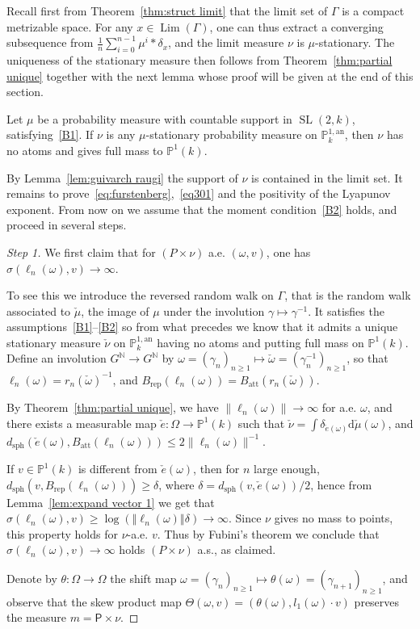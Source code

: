 \documentclass[AHL,Unicode,longabstracts]{cedram}
\DeclareMathOperator{\Lm}{Lim}
\DeclareMathOperator{\sph}{sph}
\DeclareMathOperator{\SL}{SL}
\newcommand{\nn}{\mathbb{N}}
\newcommand{\pp}{\mathbb{P}}
\newcommand{\prob}{\mathsf{P}}
\newcommand{\cv}{\rightarrow}
\newcommand{\norm}[1]{\left\Vert#1\right\Vert}
\newcommand{\PP}{\mathbb{P}}
\newcommand{\berk}{{\mathbb{P}^{1, \mathrm{an}}_k}}
\newcommand{\att}{\mathrm{att}}
\newcommand{\rep}{\mathrm{rep}}
\newcommand{\SLk}{\SL(2,k)}
\newcommand*{\dd}{\mathrm{d}}
\newenvironment{step}{\begin{proof}}{\let\qed\relax \end{proof}}
\begin{document}
Recall first from Theorem~\ref{thm:struct limit} that the limit set of $\Gamma$ is a compact metrizable space. For any $x\in \Lm(\Gamma)$, one can thus extract a converging subsequence from $\frac1{n} \sum_{i=0}^{n-1}\mu^ i \ast \delta_{x}$, and the limit measure $\nu$ is $\mu$-stationary. The uniqueness of the stationary measure then follows from Theorem~\ref{thm:partial unique} together with the next lemma whose proof will be given at the end of this section.

\begin{lemm}\label{lem:Hk}
Let $\mu$ be a probability measure with countable support in $\SLk$, satisfying~\eqref{B1}. If $\nu$ is any $\mu$-stationary probability measure on $\berk$, then $\nu$ has no atoms and gives full mass to $ \PP^1(k)$.
\end{lemm}

By Lemma~\ref{lem:guivarch raugi} the support of $\nu$ is contained in the limit set. It remains to prove~\eqref{eq:furstenberg},~\eqref{eq301} and the positivity of the Lyapunov exponent. From now on we assume that the moment condition~\eqref{B2} holds, and proceed in several steps.

\begin{step}[Step 1]
We first claim that for $(P\times \nu)$ a.e. $(\omega,v)$, one has $\sigma(\ell_n(\omega), v)\cv\infty$.

To see this we introduce the reversed random walk on $\Gamma$, that is the random walk associated to $\check \mu$, the image of $\mu$ under the involution $\gamma\mapsto \gamma^{-1}$. It satisfies the assumptions~\eqref{B1}--\eqref{B2} so from what precedes we know that it admits a unique stationary measure $\check\nu$ on $\berk$ having no atoms and putting full mass on $\PP^1(k)$. Define an involution $G^\nn\to G^\nn$ by $\omega = (\gamma_n)_{n\geq 1 }\mapsto \check \omega = (\gamma_n^{-1})_{n\geq 1}$, so that $\ell_n(\omega) = r_n(\check \omega)^{-1}$, and $B_{\rep}(\ell_n(\omega)) = B_{\att}(r_n(\check \omega))$.

By Theorem~\ref{thm:partial unique}, we have $\| \ell_n(\omega)\| \to \infty$ for a.e. $\omega$, and there exists a measurable map $\check{e}: \Omega \to \PP^1(k)$ such that $\check \nu = \int \delta_{\check e(\omega)} \dd\check\mu(\omega)$, and $d_{\sph}(\check e(\omega), B_\att(\ell_n(\omega))) \le 2\| \ell_n(\omega)\|^{-1}$.

If $v\in \pp^1(k)$ is different from $\check e(\omega)$, then for $n$ large enough, $d_{\mathrm{sph}}(v, B_{\rep}(\ell_n(\omega)))\geq \delta$, where $\delta = d_{\mathrm{sph}}(v, \check e(\omega))/2$, hence from Lemma~\ref{lem:expand vector 1} we get that $\sigma(\ell_n(\omega), v)\geq \log (\norm {\ell_n(\omega)}\delta)\to \infty$. Since $\nu$ gives no mass to points, this property holds for $\nu$-a.e. $v$. Thus by Fubini's theorem we conclude that $\sigma(\ell_n(\omega), v)\cv\infty$ holds $(P\times \nu)$ a.s., as claimed.

Denote by $\theta : \Omega \to \Omega$ the shift map $\omega = (\gamma_n)_{n\ge 1} \mapsto \theta(\omega) = (\gamma_{n+1})_{n\ge 1}$, and observe that the skew product map $\Theta(\omega,v) = (\theta(\omega), l_1(\omega) \cdot v)$ preserves the measure $m = \prob\times \nu$.
\end{step}
\end{document}
